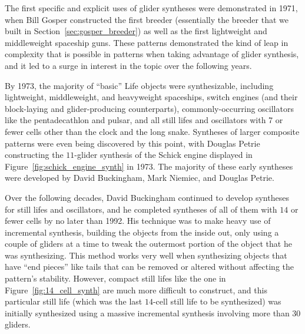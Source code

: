 The first specific and explicit uses of glider syntheses were demonstrated in 1971, when Bill Gosper constructed the first breeder (essentially the breeder that we built in Section~\ref{sec:gosper_breeder}) as well as the first lightweight and middleweight spaceship guns. These patterns demonstrated the kind of leap in complexity that is possible in patterns when taking advantage of glider synthesis, and it led to a surge in interest in the topic over the following years.

By 1973, the majority of ``basic'' Life objects were synthesizable, including lightweight, middleweight, and heavyweight spaceships, switch engines (and their block-laying and glider-producing counterparts), commonly-occurring oscillators like the pentadecathlon and pulsar, and all still lifes and oscillators with 7 or fewer cells other than the clock and the long snake. Syntheses of larger composite patterns were even being discovered by this point, with Douglas Petrie constructing the $11$-glider synthesis of the Schick engine displayed in Figure~\ref{fig:schick_engine_synth} in 1973. The majority of these early syntheses were developed by David Buckingham, Mark Niemiec, and Douglas Petrie.

Over the following decades, David Buckingham continued to develop syntheses for still lifes and oscillators, and he completed syntheses of all of them with $14$ or fewer cells by no later than 1992. His technique was to make heavy use of incremental synthesis, building the objects from the inside out, only using a couple of gliders at a time to tweak the outermost portion of the object that he was synthesizing. This method works very well when synthesizing objects that have ``end pieces'' like tails that can be removed or altered without affecting the pattern's stability. However, compact still lifes like the one in Figure~\ref{fig:14_cell_synth} are much more difficult to construct, and this particular still life (which was the last $14$-cell still life to be synthesized) was initially synthesized using a massive incremental synthesis involving more than $30$ gliders.

